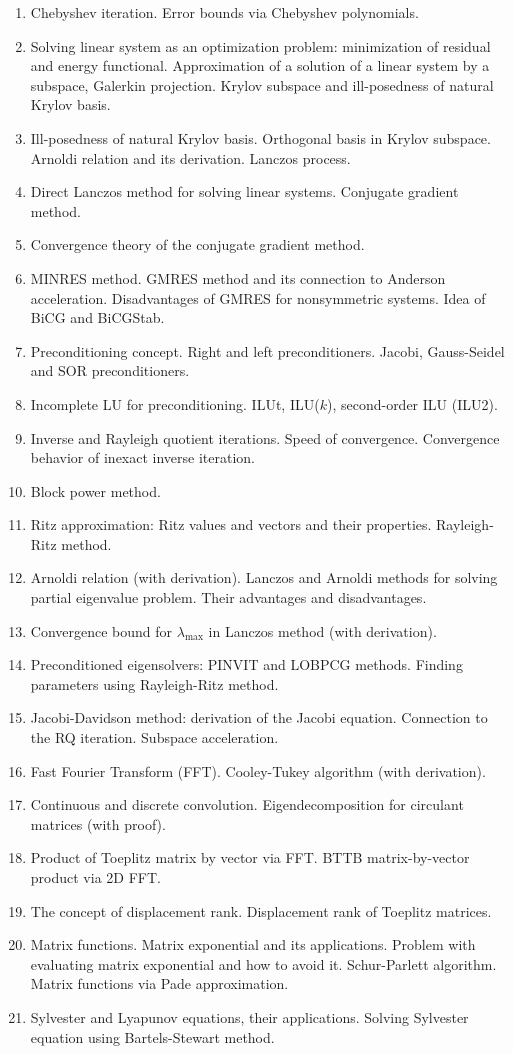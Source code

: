 \documentclass{article}
\begin{document}
\begin{enumerate}
	\item Chebyshev iteration. Error bounds via Chebyshev polynomials. 
	\item Solving linear system as an optimization problem: minimization of residual and energy functional. Approximation of a solution  of a linear system by a subspace, Galerkin projection. Krylov subspace and ill-posedness of natural Krylov basis.
	\item Ill-posedness of natural Krylov basis. Orthogonal basis in Krylov subspace. Arnoldi relation and its derivation. Lanczos process.
	\item Direct Lanczos method for solving linear systems. Conjugate gradient method.
	\item Convergence theory of the conjugate gradient method.
	\item MINRES method. GMRES method and its connection to Anderson acceleration. Disadvantages of GMRES for nonsymmetric systems. Idea of BiCG and BiCGStab.
	\item Preconditioning concept. Right and left preconditioners. Jacobi, Gauss-Seidel and SOR preconditioners.
	\item Incomplete LU for preconditioning. ILUt, ILU($k$), second-order ILU (ILU2).
	\item Inverse and Rayleigh quotient iterations. Speed of convergence. Convergence behavior of inexact inverse iteration.
	\item Block power method. 
	\item Ritz approximation: Ritz values and vectors and their properties. Rayleigh-Ritz method.
	\item Arnoldi relation (with derivation). Lanczos and Arnoldi methods for solving partial eigenvalue problem. Their advantages and disadvantages.
	\item Convergence bound for $\lambda_{\max}$ in Lanczos method (with derivation).
	\item Preconditioned eigensolvers: PINVIT and LOBPCG methods. Finding parameters using Rayleigh-Ritz method.
	\item Jacobi-Davidson method: derivation of the Jacobi equation. Connection to the RQ iteration. Subspace acceleration.
	\item Fast Fourier Transform (FFT). Cooley-Tukey algorithm (with derivation).
	\item Continuous and discrete convolution. Eigendecomposition for circulant matrices (with proof).
	\item Product of Toeplitz matrix by vector via FFT. BTTB matrix-by-vector product via 2D FFT. 
	\item The concept of displacement rank. Displacement rank of Toeplitz matrices.
	\item Matrix functions. Matrix exponential and its applications. Problem with evaluating matrix exponential and how to avoid it. Schur-Parlett algorithm. Matrix functions via Pade approximation.
	\item Sylvester and Lyapunov equations, their applications. 
Solving Sylvester equation using Bartels-Stewart method.
\end{enumerate}
\end{document}

